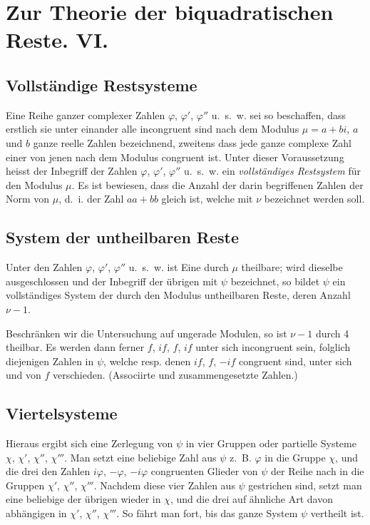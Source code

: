 \documentclass[12pt,a4paper]{article}
\begin{document}
\section*{Zur Theorie der biquadratischen Reste. VI.}

\subsection*{Vollständige Restsysteme}

Eine Reihe ganzer complexer Zahlen $\varphi$, $\varphi'$, $\varphi''$ u.~s.~w. sei so beschaffen, dass erstlich sie unter einander alle incongruent sind nach dem Modulus $\mu = a + bi$, $a$ und $b$ ganze reelle Zahlen bezeichnend, zweitens dass jede ganze complexe Zahl einer von jenen nach dem Modulus congruent ist. Unter dieser Voraussetzung heisst der Inbegriff der Zahlen $\varphi$, $\varphi'$, $\varphi''$ u.~s.~w. ein \emph{vollständiges Restsystem} für den Modulus $\mu$. Es ist bewiesen, dass die Anzahl der darin begriffenen Zahlen der Norm von $\mu$, d.~i. der Zahl $aa + bb$ gleich ist, welche mit $\nu$ bezeichnet werden soll.

\subsection*{System der untheilbaren Reste}

Unter den Zahlen $\varphi$, $\varphi'$, $\varphi''$ u.~s.~w. ist Eine durch $\mu$ theilbare; wird dieselbe ausgeschlossen und der Inbegriff der übrigen mit $\psi$ bezeichnet, so bildet $\psi$ ein vollständiges System der durch den Modulus untheilbaren Reste, deren Anzahl $\nu - 1$.

Beschränken wir die Untersuchung auf ungerade Modulen, so ist $\nu - 1$ durch 4 theilbar. Es werden dann ferner $f$, $if$, $f$, $if$ unter sich incongruent sein, folglich diejenigen Zahlen in $\psi$, welche resp. denen $if$, $f$, $-if$ congruent sind, unter sich und von $f$ verschieden. (Associirte und zusammengesetzte Zahlen.)

\subsection*{Viertelsysteme}

Hieraus ergibt sich eine Zerlegung von $\psi$ in vier Gruppen oder partielle Systeme $\chi$, $\chi'$, $\chi''$, $\chi'''$. Man setzt eine beliebige Zahl aus $\psi$ z.~B. $\varphi$ in die Gruppe $\chi$, und die drei den Zahlen $i\varphi$, $-\varphi$, $-i\varphi$ congruenten Glieder von $\psi$ der Reihe nach in die Gruppen $\chi'$, $\chi''$, $\chi'''$. Nachdem diese vier Zahlen aus $\psi$ gestrichen sind, setzt man eine beliebige der übrigen wieder in $\chi$, und die drei auf ähnliche Art davon abhängigen in $\chi'$, $\chi''$, $\chi'''$. So fährt man fort, bis das ganze System $\psi$ vertheilt ist.
\end{document}
